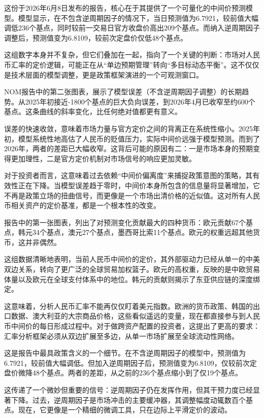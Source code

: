 \documentclass[11pt]{ctexart}
\begin{document}
这份于2026年6月8日发布的报告，核心在于其提供了一个可量化的中间价预测模型。模型显示，在不包含逆周期因子的情况下，当日预测值为6.7921，较前值大幅调低236个基点，同时较前一交易日官方收盘价高出209个基点。而纳入逆周期因子调整后，预测值变为6.8109，较前次定盘价仅低48个基点。

这组数字本身并不复杂，但它们叠加在一起，指向了一个关键的判断：市场对人民币汇率的定价逻辑，可能正在从“单边预期管理”转向“多目标动态平衡”。这不仅仅是技术层面的模型调整，更是政策框架演进的一个可观测窗口。

NOM报告中的第二张图表，展示了模型误差（不含逆周期因子调整）的长期趋势。从2025年初接近-1800个基点的巨大负向误差，到2026年4月已收窄至约600个基点。这条曲线的斜率变化，比任何绝对值都更有意义。

误差的快速收敛，意味着市场力量与官方定价之间的背离正在系统性缩小。2025年初，模型系统性地高估了人民币的贬值压力，实际中间价远强于模型预测。而到了2026年，两者的差距已大幅收窄。这背后可能的原因有二：一是市场本身的预期变得更加理性，二是官方定价机制对市场信号的响应更加灵敏。

对于投资者而言，这意味着过去依赖“中间价偏离度”来捕捉政策意图的策略，其有效性正在下降。当模型误差趋于零时，中间价本身所包含的信息量将显著增加，它不再是政策立场的扭曲信号，而更像是一个市场出清价格的近似值。这对所有人民币相关资产的定价基准，都是一个根本性的改变。

报告中的第一张图表，列出了对预测变化贡献最大的四种货币：欧元贡献67个基点，韩元34个基点，澳元27个基点，墨西哥比索11个基点。欧元的权重远超其他货币，这并非偶然。

这组数据清晰地表明，当前人民币中间价的定价，其外部驱动力已经从单一的中美双边关系，转向了更广泛的全球贸易加权篮子。欧元的高权重，反映的是中欧贸易体量以及欧元在全球支付体系中的地位。韩元的贡献则揭示了东亚供应链的深度绑定。

这意味着，分析人民币汇率不能再仅仅盯着美元指数。欧洲的货币政策、韩国的出口数据、澳大利亚的大宗商品价格，这些看似遥远的变量，现在都直接参与到人民币中间价的每日形成过程中。对于做跨资产配置的投资者，这提出了更高的要求：汇率分析框架必须从双边扩展至多边，从单一市场扩展至全球流动性网络。

这是报告中最具政策含义的一个细节。在不含逆周期因子的模型中，预测值为6.7921，较前值大幅调低。但加入逆周期因子后，预测值变为6.8109，仅较前次定盘价微降48个基点。两者的差距，从之前的236个基点缩小到了仅19个基点。

这传递了一个微妙但重要的信号：逆周期因子仍在发挥作用，但其干预力度已经显著下降。过去，逆周期因子是市场冲击的主要缓冲器，其调整幅度动辄数百个基点。现在，它更像是一个精细的微调工具，只在边际上平滑定价的波动。
\end{document}
